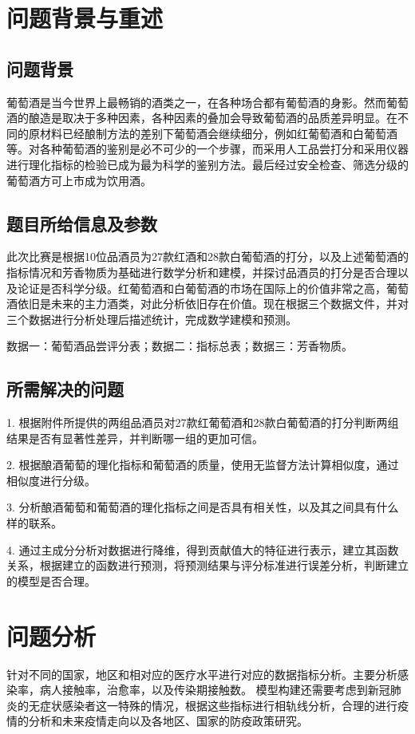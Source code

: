 \documentclass[UTF8]{ctexart}
\begin{document}
\section{问题背景与重述}
\subsection{问题背景}
葡萄酒是当今世界上最畅销的酒类之一，在各种场合都有葡萄酒的身影。然而葡萄酒的酿造是取决于多种因素，各种因素的叠加会导致葡萄酒的品质差异明显。在不同的原材料已经酿制方法的差别下葡萄酒会继续细分，例如红葡萄酒和白葡萄酒等。对各种葡萄酒的鉴别是必不可少的一个步骤，而采用人工品尝打分和采用仪器进行理化指标的检验已成为最为科学的鉴别方法。最后经过安全检查、筛选分级的葡萄酒方可上市成为饮用酒。
\subsection{题目所给信息及参数}
此次比赛是根据10位品酒员为27款红酒和28款白葡萄酒的打分，以及上述葡萄酒的指标情况和芳香物质为基础进行数学分析和建模，并探讨品酒员的打分是否合理以及论证是否科学分级。红葡萄酒和白葡萄酒的市场在国际上的价值非常之高，葡萄酒依旧是未来的主力酒类，对此分析依旧存在价值。现在根据三个数据文件，并对三个数据进行分析处理后描述统计，完成数学建模和预测。

数据一：葡萄酒品尝评分表；数据二：指标总表；数据三：芳香物质。
\subsection{所需解决的问题}
1. 根据附件所提供的两组品酒员对27款红葡萄酒和28款白葡萄酒的打分判断两组结果是否有显著性差异，并判断哪一组的更加可信。

2. 根据酿酒葡萄的理化指标和葡萄酒的质量，使用无监督方法计算相似度，通过相似度进行分级。

3. 分析酿酒葡萄和葡萄酒的理化指标之间是否具有相关性，以及其之间具有什么样的联系。

4. 通过主成分分析对数据进行降维，得到贡献值大的特征进行表示，建立其函数关系，根据建立的函数进行预测，将预测结果与评分标准进行误差分析，判断建立的模型是否合理。


\section{问题分析}
针对不同的国家，地区和相对应的医疗水平进行对应的数据指标分析。主要分析感染率，病人接触率，治愈率，以及传染期接触数。
模型构建还需要考虑到新冠肺炎的无症状感染者这一特殊的情况，根据这些指标进行相轨线分析，合理的进行疫情的分析和未来疫情走向以及各地区、国家的防疫政策研究。
\end{document}
